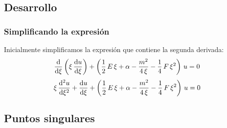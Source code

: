 \documentclass[12pt]{beamer}
\begin{document}
\subsection{Desarrollo}

\begin{frame}
\frametitle{Simplificando la expresión}
Inicialmente simplificamos la expresión que contiene la segunda derivada:
\begin{align*}
\dv{\xi} \left( \xi\, \dv{u}{\xi} \right) + \left( \dfrac{1}{2} \, E \, \xi + \alpha - \dfrac{m^{2}}{4 \, \xi} - \dfrac{1}{4} \, F \, \xi^{2} \right) \, u = 0
\end{align*}
\pause
\begin{align*}
\xi \, \dv[2]{u}{\xi} + \dv{u}{\xi} + \left( \dfrac{1}{2} \, E \, \xi + \alpha - \dfrac{m^{2}}{4 \, \xi} - \dfrac{1}{4} \, F \, \xi^{2} \right) \, u = 0
\end{align*}
\end{frame}

\subsection{Puntos singulares}
\end{document}
